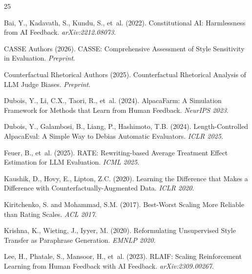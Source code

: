\documentclass[11pt,a4paper]{article}
\begin{document}

\begin{thebibliography}{25}

Bai, Y., Kadavath, S., Kundu, S., et~al. (2022).
\newblock Constitutional AI: Harmlessness from AI Feedback.
\newblock \emph{arXiv:2212.08073}.

CASSE Authors (2026).
\newblock CASSE: Comprehensive Assessment of Style Sensitivity in Evaluation.
\newblock \emph{Preprint}.

Counterfactual Rhetorical Authors (2025).
\newblock Counterfactual Rhetorical Analysis of LLM Judge Biases.
\newblock \emph{Preprint}.

Dubois, Y., Li, C.X., Taori, R., et~al. (2024).
\newblock AlpacaFarm: A Simulation Framework for Methods that Learn from Human Feedback.
\newblock \emph{NeurIPS 2023}.

Dubois, Y., Galambosi, B., Liang, P., Hashimoto, T.B. (2024).
\newblock Length-Controlled AlpacaEval: A Simple Way to Debias Automatic Evaluators.
\newblock \emph{ICLR 2025}.

Feuer, B., et~al. (2025).
\newblock RATE: Rewriting-based Average Treatment Effect Estimation for LLM Evaluation.
\newblock \emph{ICML 2025}.

Kaushik, D., Hovy, E., Lipton, Z.C. (2020).
\newblock Learning the Difference that Makes a Difference with Counterfactually-Augmented Data.
\newblock \emph{ICLR 2020}.

Kiritchenko, S. and Mohammad, S.M. (2017).
\newblock Best-Worst Scaling More Reliable than Rating Scales.
\newblock \emph{ACL 2017}.

Krishna, K., Wieting, J., Iyyer, M. (2020).
\newblock Reformulating Unsupervised Style Transfer as Paraphrase Generation.
\newblock \emph{EMNLP 2020}.

Lee, H., Phatale, S., Mansoor, H., et~al. (2023).
\newblock RLAIF: Scaling Reinforcement Learning from Human Feedback with AI Feedback.
\newblock \emph{arXiv:2309.00267}.


\end{thebibliography}
\end{document}
